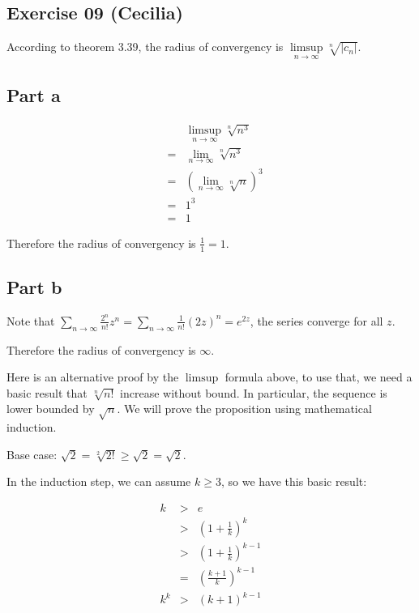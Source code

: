 \subsection*{Exercise 09 (Cecilia)}

According to theorem 3.39, the radius of convergency is $ \limsup\limits_{n \to \infty} \sqrt[n]{|c_n|} $.

\subsection*{Part a}

\begin{eqnarray*}
  & & \limsup\limits_{n \to \infty} \sqrt[n]{n^3} \\
  &=& \lim\limits_{n \to \infty} \sqrt[n]{n^3} \\
  &=& \left(\lim\limits_{n \to \infty} \sqrt[n]{n}\right)^3 \\
  &=& 1^3 \\
  &=& 1
\end{eqnarray*}

Therefore the radius of convergency is $ \frac{1}{1} = 1 $.

\subsection*{Part b}

Note that $ \sum\limits_{n \to \infty} \frac{2^n}{n!} z^n = \sum\limits_{n \to \infty} \frac{1}{n!} (2z)^n = e^{2z} $, the series converge for all $ z $.

Therefore the radius of convergency is $ \infty $.

Here is an alternative proof by the $ \limsup $ formula above, to use that, we need a basic result that $ \sqrt[n]{n!} $ increase without bound. In particular, the sequence is lower bounded by $ \sqrt{n} $. We will prove the proposition using mathematical induction.

Base case: $ \sqrt{2} = \sqrt[2]{2!} \ge \sqrt{2} = \sqrt{2} $.

In the induction step, we can assume $ k \ge 3 $, so we have this basic result:

\begin{eqnarray*}
    k & > & e \\
      & > & \left(1 + \frac{1}{k}\right)^k \\
      & > & \left(1 + \frac{1}{k}\right)^{k-1} \\
      & = & \left(\frac{k+1}{k}\right)^{k-1} \\
  k^k & > & (k+1)^{k-1}
\end{eqnarray*}

